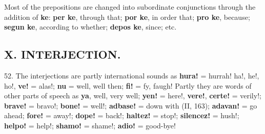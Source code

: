 Most of the prepositions are changed into subordinate conjunctions through the addition of \textbf{ke}: \textbf{per ke}, through that; \textbf{por ke}, in order that; \textbf{pro ke}, because; \textbf{segun ke}, according to whether; \textbf{depos ke}, since; etc.

\subsection*{X. INTERJECTION.}
52. The interjections are partly international sounds as \textbf{hura!} = hurrah! ha!, he!, ho!, \textbf{ve!} = alas!; \textbf{nu} = well, well then; \textbf{fi!} = fy, faugh! Partly they are words of other parts of speech as \textbf{ya}, well, very well; \textbf{yen!} = here!, \textbf{vere!}, \textbf{certe!} = verily!; \textbf{brave!} = bravo!; \textbf{bone!} = well!; \textbf{adbase!} = down with (II, 163); \textbf{adavan!} = go ahead; \textbf{fore!} = away!; \textbf{dope!} = back!; \textbf{haltez!} = stop!; \textbf{silencez!} = hush!; \textbf{helpo!} = help!; \textbf{shamo!} = shame!; \textbf{adio!} = good-bye! 
